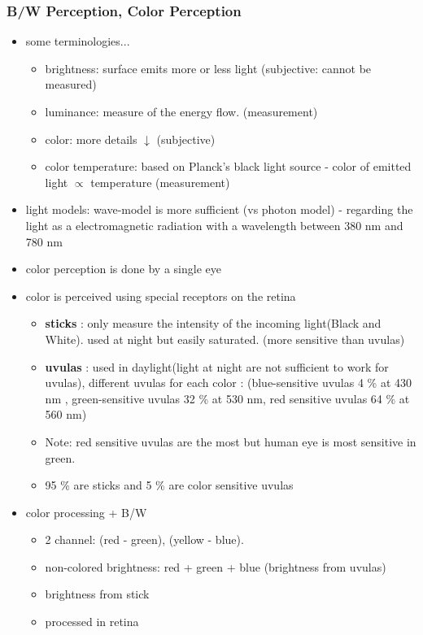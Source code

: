\documentclass{standalone}
\begin{document}
\subsubsection{B/W Perception, Color Perception}
\begin{itemize}
	\item some terminologies...
		\begin{itemize}
			\item brightness: surface emits more or less light (subjective: cannot be measured)
			\item luminance: measure of the energy flow. (measurement)
			\item color: more details $\downarrow$ (subjective)
			\item color temperature: based on Planck's black light source - color of emitted light $\propto$ temperature (measurement)
		\end{itemize}
	\item light models: wave-model is more sufficient (vs photon model) - regarding the light as a electromagnetic radiation with a wavelength between 380 nm and 780 nm
	\item color perception is done by a single eye
	\item color is perceived using special receptors on the retina
		\begin{itemize}
			\item \textbf{sticks} : only measure the intensity of the incoming light(Black and White). used at night but easily saturated. (more sensitive than uvulas)
			\item \textbf{uvulas} : used in daylight(light at night are not sufficient to work for uvulas), different uvulas for each color : (blue-sensitive uvulas 4 \% at 430 nm , green-sensitive uvulas 32 \% at 530 nm, red sensitive uvulas 64 \% at 560 nm) 
			\item Note: red sensitive uvulas are the most but human eye is most sensitive in green.
			\item 95 \% are sticks and 5 \% are color sensitive uvulas
		\end{itemize}
	\item color processing + B/W
		\begin{itemize}
			\item 2 channel: (red - green), (yellow - blue). 
			\item non-colored brightness: red + green + blue (brightness from uvulas)
			\item brightness from stick
			\item processed in retina 

\end{itemize}
\end{itemize}
\end{document}
